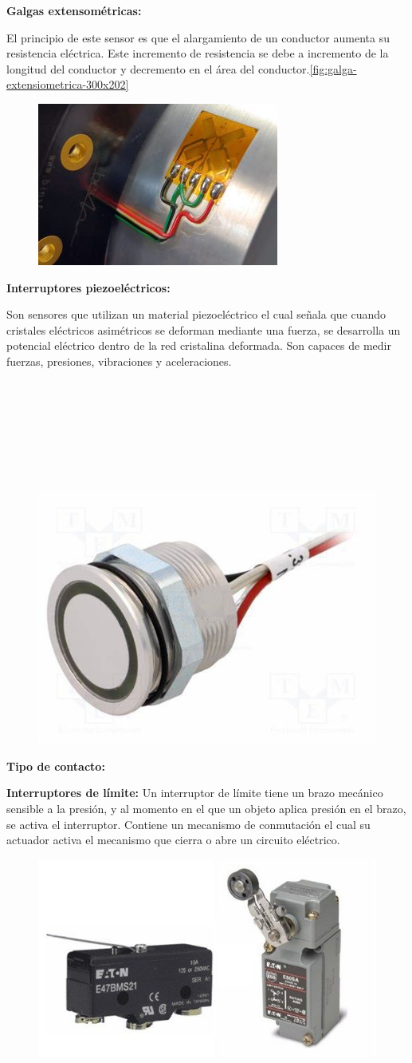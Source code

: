 \textbf{Galgas extensométricas:}

El principio de este sensor es que el alargamiento de un conductor aumenta su resistencia eléctrica. Este incremento de resistencia se debe a incremento de la longitud del conductor y decremento en el área del conductor.\autoref{fig:galga-extensiometrica-300x202}

\begin{figure}[h]
	\centering
	\includegraphics[width=0.3\linewidth, height=0.2\textheight]{img/galga-extensiometrica-300x202}
	\caption{}
	\label{fig:galga-extensiometrica-300x202}
\end{figure}

\textbf{Interruptores piezoeléctricos:}

Son sensores que utilizan un material piezoeléctrico el cual señala que cuando cristales eléctricos asimétricos se deforman mediante una fuerza, se desarrolla un potencial eléctrico dentro de la red cristalina deformada. Son capaces de medir fuerzas, presiones, vibraciones y aceleraciones.\\\\\\\\\\\\\\\\


\begin{figure}[h]
	\centering
	\includegraphics[width=0.3\linewidth, height=0.2\textheight]{img/S}
	\caption[f]{}
	\label{fig:s}
\end{figure}

\textbf{Tipo de contacto: }

\textbf{Interruptores de límite: }
Un interruptor de límite tiene un brazo mecánico sensible a la presión, y al momento  en el que un  objeto aplica presión en el brazo, se activa el interruptor.  Contiene un mecanismo de conmutación el cual su actuador activa el mecanismo que cierra o abre un circuito eléctrico. 
\begin{figure}[h]
	\centering
	\includegraphics[width=0.4\linewidth, height=0.2\textwidth]{img/intlimite}
	\caption{}
	\label{fig:intlimite}
\end{figure}

